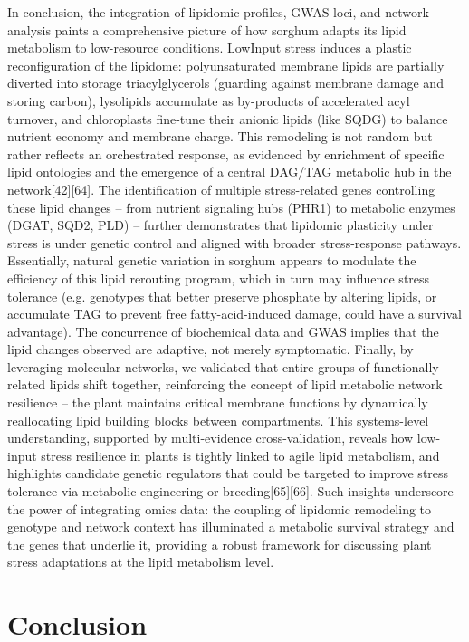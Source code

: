 \documentclass[10pt,letterpaper]{article}
\begin{document}
\begin{itemize}
In conclusion, the integration of lipidomic profiles, GWAS loci, and network analysis paints a comprehensive picture of how sorghum adapts its lipid metabolism to low-resource conditions. LowInput stress induces a plastic reconfiguration of the lipidome: polyunsaturated membrane lipids are partially diverted into storage triacylglycerols (guarding against membrane damage and storing carbon), lysolipids accumulate as by-products of accelerated acyl turnover, and chloroplasts fine-tune their anionic lipids (like SQDG) to balance nutrient economy and membrane charge. This remodeling is not random but rather reflects an orchestrated response, as evidenced by enrichment of specific lipid ontologies and the emergence of a central DAG/TAG metabolic hub in the network[42][64]. The identification of multiple stress-related genes controlling these lipid changes – from nutrient signaling hubs (PHR1) to metabolic enzymes (DGAT, SQD2, PLD) – further demonstrates that lipidomic plasticity under stress is under genetic control and aligned with broader stress-response pathways. Essentially, natural genetic variation in sorghum appears to modulate the efficiency of this lipid rerouting program, which in turn may influence stress tolerance (e.g. genotypes that better preserve phosphate by altering lipids, or accumulate TAG to prevent free fatty-acid-induced damage, could have a survival advantage). The concurrence of biochemical data and GWAS implies that the lipid changes observed are adaptive, not merely symptomatic. Finally, by leveraging molecular networks, we validated that entire groups of functionally related lipids shift together, reinforcing the concept of lipid metabolic network resilience – the plant maintains critical membrane functions by dynamically reallocating lipid building blocks between compartments. This systems-level understanding, supported by multi-evidence cross-validation, reveals how low-input stress resilience in plants is tightly linked to agile lipid metabolism, and highlights candidate genetic regulators that could be targeted to improve stress tolerance via metabolic engineering or breeding[65][66]. Such insights underscore the power of integrating omics data: the coupling of lipidomic remodeling to genotype and network context has illuminated a metabolic survival strategy and the genes that underlie it, providing a robust framework for discussing plant stress adaptations at the lipid metabolism level.



\section*{Conclusion}


\end{itemize}
\end{document}
